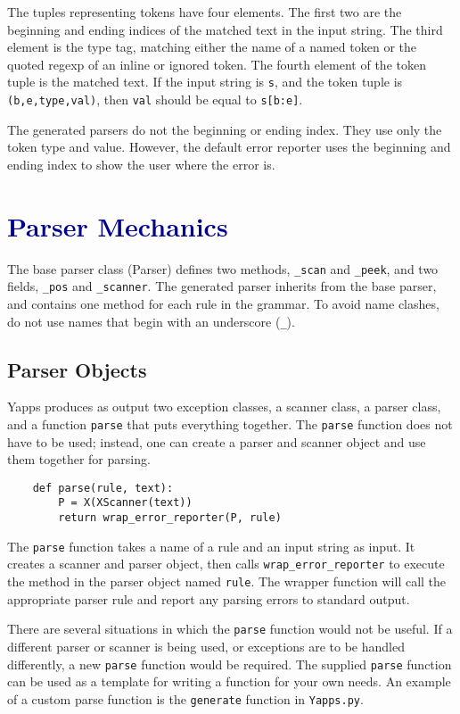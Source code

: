 \documentclass[10pt]{article}
\newcommand{\mysection}[1]{\section{\textcolor{darkblue}{#1}}}
\newcommand{\mysubsection}[1]{\subsection{\textcolor{darkerblue}{#1}}}
\begin{document}
The tuples representing tokens have four elements.  The first two are
the beginning and ending indices of the matched text in the input
string.  The third element is the type tag, matching either the name
of a named token or the quoted regexp of an inline or ignored token.
The fourth element of the token tuple is the matched text.  If the
input string is \texttt{s}, and the token tuple is
\texttt{(b,e,type,val)}, then \texttt{val} should be equal to
\texttt{s[b:e]}.

The generated parsers do not the beginning or ending index.  They use
only the token type and value.  However, the default error reporter
uses the beginning and ending index to show the user where the error
is.

\mysection{Parser Mechanics}

The base parser class (Parser) defines two methods, \texttt{\_scan}
and \texttt{\_peek}, and two fields, \texttt{\_pos} and
\texttt{\_scanner}.  The generated parser inherits from the base
parser, and contains one method for each rule in the grammar.  To
avoid name clashes, do not use names that begin with an underscore
(\texttt{\_}).

\mysubsection{Parser Objects}
\label{sec:Parser-Objects}

Yapps produces as output two exception classes, a scanner class, a
parser class, and a function \texttt{parse} that puts everything
together.  The \texttt{parse} function does not have to be used;
instead, one can create a parser and scanner object and use them
together for parsing.

\begin{verbatim}
    def parse(rule, text):
        P = X(XScanner(text))
        return wrap_error_reporter(P, rule)
\end{verbatim}

The \texttt{parse} function takes a name of a rule and an input string
as input.  It creates a scanner and parser object, then calls
\texttt{wrap\_error\_reporter} to execute the method in the parser
object named \texttt{rule}.  The wrapper function will call the
appropriate parser rule and report any parsing errors to standard
output.

There are several situations in which the \texttt{parse} function
would not be useful.  If a different parser or scanner is being used,
or exceptions are to be handled differently, a new \texttt{parse}
function would be required.  The supplied \texttt{parse} function can
be used as a template for writing a function for your own needs.  An
example of a custom parse function is the \texttt{generate} function
in \texttt{Yapps.py}.
\end{document}
